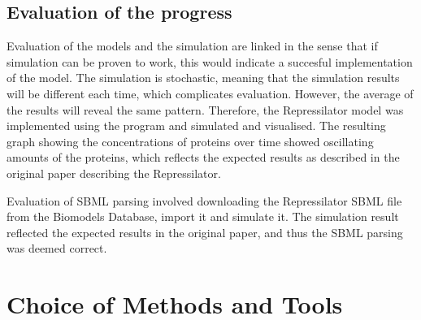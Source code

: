 \documentclass{article}
\begin{document}
	\subsection{Evaluation of the progress}
	\par Evaluation of the models and the simulation are linked in the sense that if simulation can be proven to work, this would indicate a succesful implementation of the model. The simulation is stochastic, meaning that the simulation results will be different each time, which complicates evaluation. However, the average of the results will reveal the same pattern. Therefore, the Repressilator \cite{repressilator} model was implemented using the program and simulated and visualised. The resulting graph showing the concentrations of proteins over time showed oscillating amounts of the proteins, which reflects the expected results as described in the original paper describing the Repressilator.
	\par Evaluation of SBML parsing involved downloading the Repressilator SBML file from the Biomodels Database, import it and simulate it. The simulation result reflected the expected results in the original paper, and thus the SBML parsing was deemed correct.
	
	\section{Choice of Methods and Tools}
	
	
\end{document}
